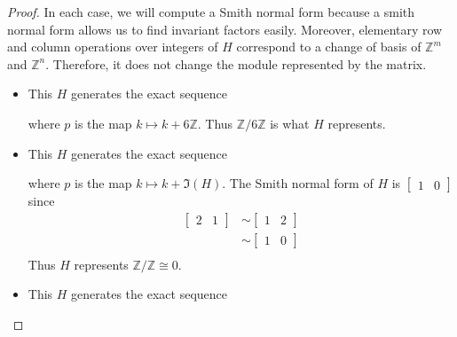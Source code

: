\documentclass[12pt, psamsfonts]{amsart}
\theoremstyle{definition}
\theoremstyle{remark}
\numberwithin{equation}{section}
\begin{document}
\begin{proof}
  In each case, we will compute a Smith normal form because a smith normal form allows us to find invariant factors easily.
  Moreover, elementary row and column operations over integers of $H$ correspond to a change of basis of $\mathbb{Z}^m$ and $\mathbb{Z}^n$.
  Therefore, it does not change the module represented by the matrix.
  \begin{itemize}
    \item
      This $H$ generates the exact sequence

      \begin{center}
      \end{center}

      where $p$ is the map $k \mapsto k + 6\mathbb{Z}$.
      Thus $\mathbb{Z}/6\mathbb{Z}$ is what $H$ represents.
    \item
      This $H$ generates the exact sequence

      \begin{center}
      \end{center}

      where $p$ is the map $k \mapsto k + \Im(H)$.
      The Smith normal form of $H$ is $\begin{bmatrix} 1 & 0 \end{bmatrix}$ since
      \begin{align*}
        \begin{bmatrix} 2 & 1 \end{bmatrix}
          &\sim \begin{bmatrix} 1 & 2 \end{bmatrix} \\
          &\sim \begin{bmatrix} 1 & 0 \end{bmatrix} \\
      \end{align*}
      Thus $H$ represents $\mathbb{Z}/\mathbb{Z} \cong 0$.
    \item
      This $H$ generates the exact sequence

      \begin{center}
      \end{center}


\end{itemize}
\end{proof}
\end{document}
